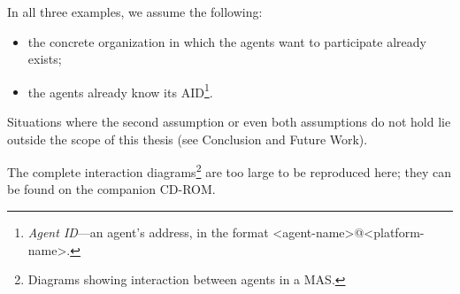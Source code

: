 In all three examples, we assume the following:
\begin{itemize}
	\item the concrete organization in which the agents want to participate already exists;
	\item the agents already know its AID\footnote{\textit{Agent ID}---an agent's address, in the format \textless{}agent-name\textgreater{}@\textless{}platform-name\textgreater{}.}.
\end{itemize}
Situations where the second assumption or even both assumptions do not hold lie outside the scope of this thesis (see Conclusion and Future Work).

The complete interaction diagrams\footnote{Diagrams showing interaction between agents in a MAS.} are too large to be reproduced here; they can be found on the companion CD-ROM. 





